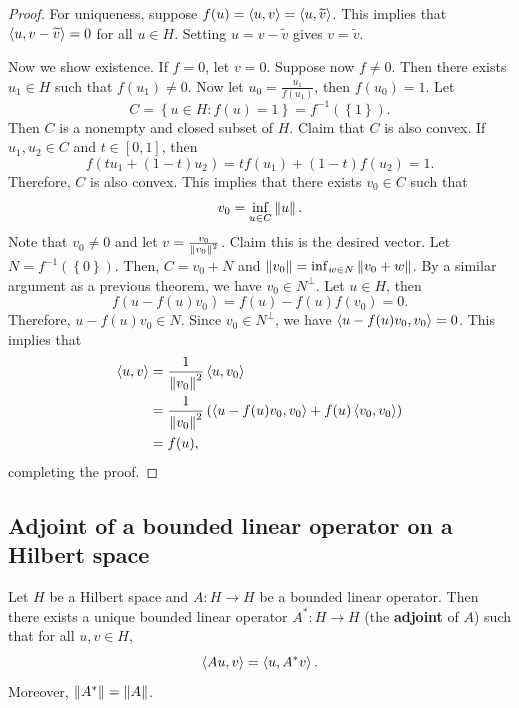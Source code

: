 \documentclass[a4paper]{article}
\begin{document}
\begin{proof}
For uniqueness, suppose $f(u) = \left\langle u, v \right\rangle 
= \left\langle u, \widetilde{v} \right\rangle$. This implies that 
$\left\langle u, v - \widetilde{v} \right\rangle = 0$ for all $u \in H$.
Setting $u = v - \tilde{v}$ gives $v = \tilde{v}$. 

Now we show existence. If $f = 0$, let $v = 0$.
Suppose now $f \neq 0$. Then there exists 
$u_1 \in H$ such that $f(u_1) \neq 0$. 
Now let $u_0 = \frac{u_1}{f(u_1)}$, then $f(u_0) = 1$. 
Let 
\[
C = \left\{ u \in H: f(u) = 1 \right\} = f^{-1}
(\left\{ 1 \right\}).
\]
Then $C$ is a nonempty and closed subset of $H$. 
Claim that $C$ is also convex. If $u_1, u_2 \in C$ 
and $t \in [0, 1]$, then 
\[
f(t u_1 + (1-t) u_2) = t f(u_1) + (1 - t) f(u_2) = 1.
\]
Therefore, $C$ is also convex. This implies that 
there exists $v_0 \in C$ such that 
\[
v_0 = \inf_{u \in C} \left\lVert u\right\rVert.
\]
Note that $v_0 \neq 0$ and let $v = \frac{v_0}{\left\lVert v_0\right\rVert^2}$.
Claim this is the desired vector. Let $N = f^{-1} 
(\left\{ 0 \right\})$. Then, 
$C = v_0 + N$ and $\left\lVert v_0\right\rVert = \inf_{w \in N} \left\lVert v_0 + w\right\rVert$.
By a similar argument as a previous theorem, 
we have $v_0 \in N^\perp$. Let $u \in H$, then 
\[
f(u - f(u) v_0) = f(u) - f(u) f(v_0) = 0.
\]
Therefore, $u - f(u)v_0 \in N$. Since $v_0 \in N^\perp$,
we have $\left\langle u - f(u) v_0, v_0 \right\rangle = 0$. This implies that
\[
\begin{aligned}
  \left\langle u, v \right\rangle 
  &= \frac{1}{\left\lVert v_0\right\rVert^2} \left\langle u, v_0 \right\rangle \\
  &= \frac{1}{\left\lVert v_0\right\rVert^2} \left( \left\langle u - f(u)v_0, v_0 \right\rangle 
  + f(u) \left\langle v_0, v_0 \right\rangle \right) \\
  &= f(u),
\end{aligned}
\]
completing the proof.
\end{proof}

\subsection{Adjoint of a bounded linear operator 
on a Hilbert space}

\begin{thm}
Let $H$ be a Hilbert space and $A : H \to H$ be a bounded 
linear operator. Then there exists a unique bounded linear 
operator $A^* : H \to H$ (the \textbf{adjoint} of $A$) such 
that for all $u, v \in H$, 
\[
\left\langle A u, v \right\rangle = \left\langle u, A^* v \right\rangle.
\]
Moreover, $\left\lVert A^*\right\rVert = \left\lVert A\right\rVert$.
\end{thm}
\end{document}
